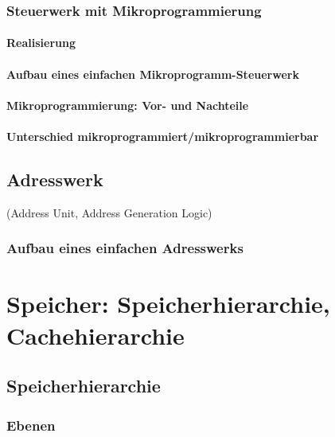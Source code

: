 \subsection{Steuerwerk mit Mikroprogrammierung}

\subsubsection{Realisierung}
\subsubsection*{Aufbau eines einfachen Mikroprogramm-Steuerwerk}
\subsubsection{Mikroprogrammierung: Vor- und Nachteile}
\subsubsection{Unterschied mikroprogrammiert/mikroprogrammierbar}

\section{Adresswerk}
(Address Unit, Address Generation Logic)

\subsection*{Aufbau eines einfachen Adresswerks}

\chapter{Speicher: Speicherhierarchie, Cachehierarchie}
\section{Speicherhierarchie}

\subsection{Ebenen}

